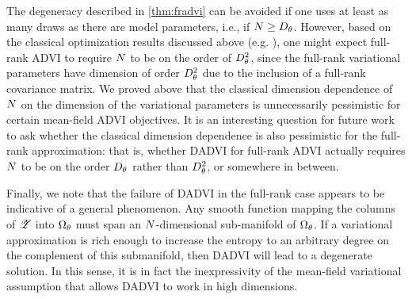 The degeneracy described in \cref{thm:fradvi} can be avoided if one uses at
least as many draws as there are model parameters, i.e., if $N \ge
D_{\theta}$.  However, based on the classical optimization results discussed
above (e.g. \citet[Chapter 5]{shapiro:2021:lectures}), one might expect
full-rank ADVI to require $N$ to be on the order of $D_{\theta}^2$, since the
full-rank variational parameters have dimension of order $D_{\theta}^2$ due to
the inclusion of a full-rank covariance matrix.  We proved above that the
classical dimension dependence of $N$ on the dimension of the variational
parameters is unnecessarily pessimistic for certain mean-field ADVI objectives.
It is an interesting question for future work to ask whether the classical
dimension dependence is also pessimistic for the full-rank approximation: that
is, whether DADVI for full-rank ADVI actually requires $N$ to be on the
order $D_{\theta}$ rather than $D_{\theta}^2$, or somewhere in between.

Finally, we note that the failure of DADVI in the full-rank case appears to be
indicative of a general phenomenon. Any smooth function mapping the columns of
$\mathscr{Z}$ into $\Omega_{\theta}$ must span an $N$-dimensional sub-manifold of
$\Omega_{\theta}$.  If a variational approximation is rich enough to increase the
entropy to an arbitrary degree on the complement of this submanifold, then DADVI
will lead to a degenerate solution. In this sense, it is in fact the
inexpressivity of the mean-field variational assumption that allows DADVI to
work in high dimensions.